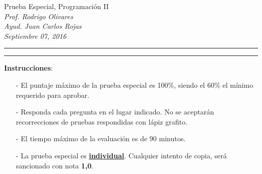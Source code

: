 \documentclass[10pt]{article}
\begin{document}
\begin{center}
    {\Large Prueba Especial, Programaci\'on II} \\
    \emph{\small Prof. Rodrigo Olivares} \\
    \emph{\small Ayud. Juan Carlos Rojas} \\
    \emph{\scriptsize Septiembre 07, 2016}
\end{center}
\vspace*{-35pt}
\begin{center}
    \rule{1\textwidth}{.3pt}
\end{center}
\vspace*{-42pt}
\begin{center}
    \rule{1\textwidth}{2pt}
\end{center}

\vspace*{-15pt}
\textbf{Instrucciones}:
\vspace*{-15pt}

\begin{itemize}
    \item[-] El puntaje m\'aximo de la prueba especial es 100\%, siendo el 60\% el m\'inimo requerido para aprobar.
	\item[-] Responda cada pregunta en el lugar indicado. No se aceptar\'an recorrecciones de pruebas respondidas con l\'apiz grafito.
	\item[-] El tiempo m\'aximo de la evaluaci\'on es de 90 minutos.
    \item[-] La prueba especial es \underline{\textbf{individual}}. Cualquier intento de copia, ser\'a sancionado con nota \textbf{1,0}.
\end{itemize}
\vspace*{-20pt}
\end{document}
